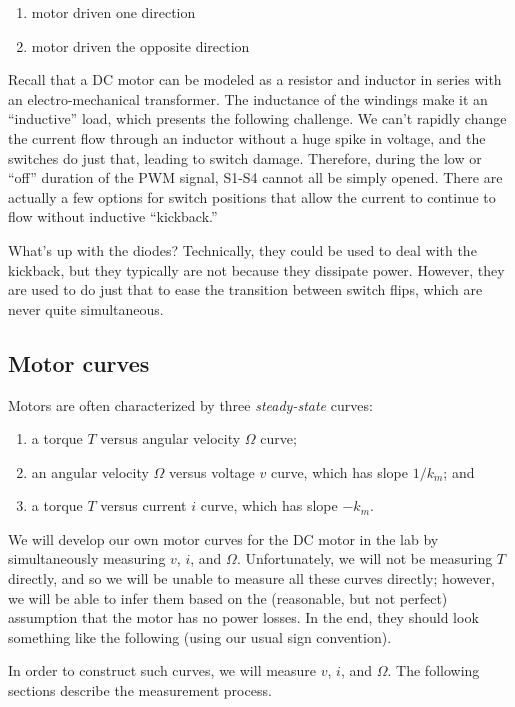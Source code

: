 \documentclass[dynamic_systems.tex]{subfiles}
\begin{document}
\begin{enumerate}
\def\labelenumi{(\alph{enumi})}
\tightlist
	\item
  	motor driven one direction
  \item
    motor driven the opposite direction
\end{enumerate}

Recall that a DC motor can be modeled as a resistor and inductor in
series with an electro-mechanical transformer. The inductance of the
windings make it an ``inductive'' load, which presents the following
challenge. We can't rapidly change the current flow through an inductor
without a huge spike in voltage, and the switches do just that, leading
to switch damage. Therefore, during the low or ``off'' duration of the
PWM signal, S1-S4 cannot all be simply opened. There are actually a few
options for switch positions that allow the current to continue to flow
without inductive ``kickback.''

What's up with the diodes? Technically, they could be used to deal with
the kickback, but they typically are not because they dissipate power.
However, they are used to do just that to ease the transition between
switch flips, which are never quite simultaneous.
\tags{}

\hypertarget{motor-curves}{\subsection{Motor
curves}\label{motor-curves}}

Motors are often characterized by three \emph{steady-state} curves:
\tags{}

\begin{enumerate}
\def\labelenumi{\arabic{enumi}.}
\tightlist
\item
  a torque \(T\) versus angular velocity \(\Omega\) curve;
\item
  an angular velocity \(\Omega\) versus voltage \(v\) curve, which has
  slope \(1/k_m\); and
\item
  a torque \(T\) versus current \(i\) curve, which has slope \(-k_m\).
\end{enumerate}

We will develop our own motor curves for the DC motor in the lab by
simultaneously measuring \(v\), \(i\), and \(\Omega\). Unfortunately, we
will not be measuring \(T\) directly, and so we will be unable to
measure all these curves directly; however, we will be able to infer
them based on the (reasonable, but not perfect) assumption that the
motor has no power losses. In the end, they should look something like
the following (using our usual sign convention).

In order to construct such curves, we will measure \(v\), \(i\), and
\(\Omega\). The following sections describe the measurement process.

\begin{exercises}

\end{exercises}
\end{document}
